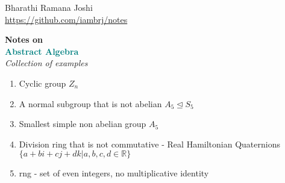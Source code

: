 \documentclass[titlepage, 12pt]{article}
\newcommand*{\logo}{\fbox{$\mathfrak{BRJ}$}}
\begin{document}
\begin{titlepage}

	\raggedleft

	\vspace*{\baselineskip}

	{Bharathi Ramana Joshi\\\url{https://github.com/iambrj/notes}}

	\vspace*{0.167\textheight}

	\textbf{\LARGE Notes on}\\[\baselineskip]

	\textbf{\textcolor{teal}{\huge Abstract Algebra}}\\[\baselineskip]

    {\Large \textit{Collection of examples}}

	\vfill

	{\large \logo}

	\vspace*{3\baselineskip}

\end{titlepage}

\newpage
    \begin{enumerate}
        \item Cyclic group $Z_n$
        \item A normal subgroup that is not abelian $A_5\trianglelefteq S_5$
        \item Smallest simple non abelian group $A_5$
        \item Division ring that is not commutative - Real Hamiltonian
            Quaternions $\{a+bi+cj+dk|a,b,c,d\in\mathbb{R}\}$
        \item rng - set of even integers, no multiplicative identity
    \end{enumerate}
\end{document}

